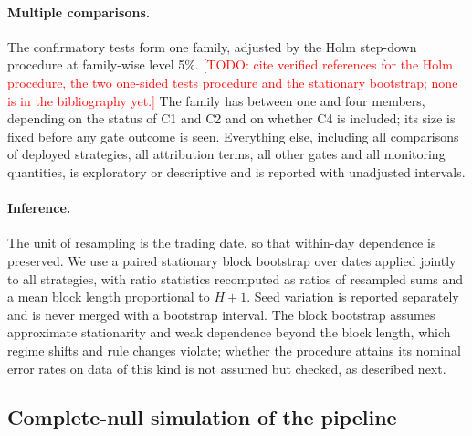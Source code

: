 \documentclass[11pt]{article}
\theoremstyle{remark}
\newcommand{\todo}[1]{\textcolor{red}{[TODO: #1]}}
\begin{document}
\paragraph{Multiple comparisons.}
The confirmatory tests form one family, adjusted by the Holm step-down procedure at family-wise
level 5\%.
\todo{cite verified references for the Holm procedure, the two one-sided tests procedure and the
stationary bootstrap; none is in the bibliography yet.}
The family has between one and four members, depending on the status of C1 and C2 and on
whether C4 is included; its size is fixed before any gate outcome is seen. Everything else,
including all comparisons of deployed strategies, all attribution terms, all other gates and all
monitoring quantities, is exploratory or descriptive and is reported with unadjusted intervals.

\paragraph{Inference.}
The unit of resampling is the trading date, so that within-day dependence is preserved. We use a
paired stationary block bootstrap over dates applied jointly to all strategies, with ratio
statistics recomputed as ratios of resampled sums and a mean block length proportional to
$H+1$. Seed variation is reported separately and is never merged with a bootstrap interval. The
block bootstrap assumes approximate stationarity and weak dependence beyond the block length,
which regime shifts and rule changes violate; whether the procedure attains its nominal error
rates on data of this kind is not assumed but checked, as described next.

\subsection{Complete-null simulation of the pipeline}
\end{document}

